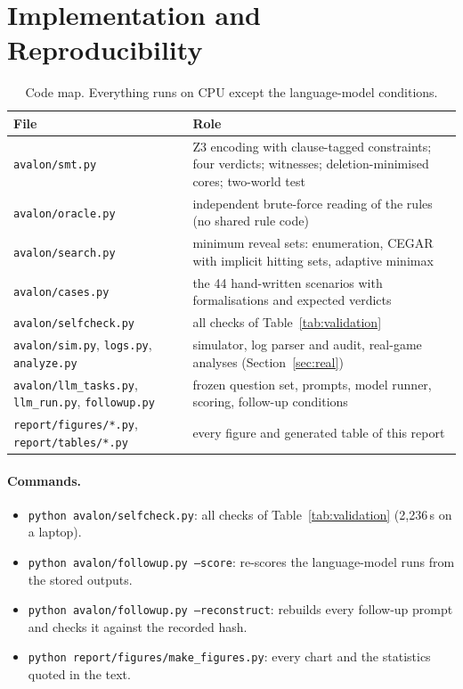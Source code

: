 \documentclass[runningheads]{llncs}
\begin{document}
\section{Implementation and Reproducibility}\label{app:repro}
\sloppy
\begin{table}[!htb]
\caption{Code map. Everything runs on CPU except the language-model conditions.}
\centering\scriptsize
\setlength{\tabcolsep}{4pt}\renewcommand{\arraystretch}{1.1}
\begin{tabularx}{\textwidth}{@{}l X@{}}
\toprule
File & Role\\
\midrule
\texttt{avalon/smt.py} & Z3 encoding with clause-tagged constraints; four verdicts; witnesses; deletion-minimised cores; two-world test\\
\texttt{avalon/oracle.py} & independent brute-force reading of the rules (no shared rule code)\\
\texttt{avalon/search.py} & minimum reveal sets: enumeration, CEGAR with implicit hitting sets, adaptive minimax\\
\texttt{avalon/cases.py} & the 44 hand-written scenarios with formalisations and expected verdicts\\
\texttt{avalon/selfcheck.py} & all checks of Table~\ref{tab:validation}\\
\texttt{avalon/sim.py}, \texttt{logs.py}, \texttt{analyze.py} & simulator, log parser and audit, real-game analyses (Section~\ref{sec:real})\\
\texttt{avalon/llm\_tasks.py}, \texttt{llm\_run.py}, \texttt{followup.py} & frozen question set, prompts, model runner, scoring, follow-up conditions\\
\texttt{report/figures/*.py}, \texttt{report/tables/*.py} & every figure and generated table of this report\\
\bottomrule
\end{tabularx}
\end{table}

\paragraph{Commands.}\leavevmode
\begin{itemize}[leftmargin=1.2em]
\item \texttt{python avalon/selfcheck.py}: all checks of Table~\ref{tab:validation} (2,236\,s on a laptop).
\item \texttt{python avalon/followup.py --score}: re-scores the language-model runs from the stored outputs.
\item \texttt{python avalon/followup.py --reconstruct}: rebuilds every follow-up prompt and checks it against
the recorded hash.
\item \texttt{python report/figures/make\_figures.py}: every chart and the statistics quoted in the text.
\end{itemize}
\end{document}
